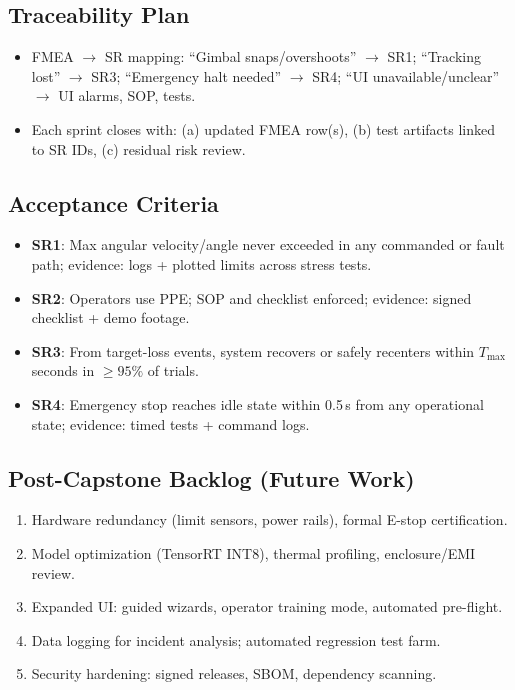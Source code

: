\documentclass{article}
\begin{document}
\subsection{Traceability Plan}
\begin{itemize}
  \item FMEA \(\rightarrow\) SR mapping: “Gimbal snaps/overshoots” \(\rightarrow\) SR1;
        “Tracking lost” \(\rightarrow\) SR3; “Emergency halt needed” \(\rightarrow\)
        SR4; “UI unavailable/unclear” \(\rightarrow\) UI alarms, SOP, tests.
  \item Each sprint closes with: (a) updated FMEA row(s), (b) test artifacts linked to
        SR IDs, (c) residual risk review.
\end{itemize}

\subsection{Acceptance Criteria}
\begin{itemize}
  \item \textbf{SR1}: Max angular velocity/angle never exceeded in any commanded or fault path; evidence: logs + plotted limits across stress tests.
  \item \textbf{SR2}: Operators use PPE; SOP and checklist enforced; evidence: signed checklist + demo footage.
  \item \textbf{SR3}: From target-loss events, system recovers or safely recenters within \(T_{\max}\) seconds in \(\geq 95\%\) of trials.
  \item \textbf{SR4}: Emergency stop reaches idle state within 0.5\,s from any operational state; evidence: timed tests + command logs.
\end{itemize}

\subsection{Post-Capstone Backlog (Future Work)}
\begin{enumerate}
  \item Hardware redundancy (limit sensors, power rails), formal E-stop certification.
  \item Model optimization (TensorRT INT8), thermal profiling, enclosure/EMI review.
  \item Expanded UI: guided wizards, operator training mode, automated pre-flight.
  \item Data logging for incident analysis; automated regression test farm.
  \item Security hardening: signed releases, SBOM, dependency scanning.
\end{enumerate}
\newpage{}
\end{document}
